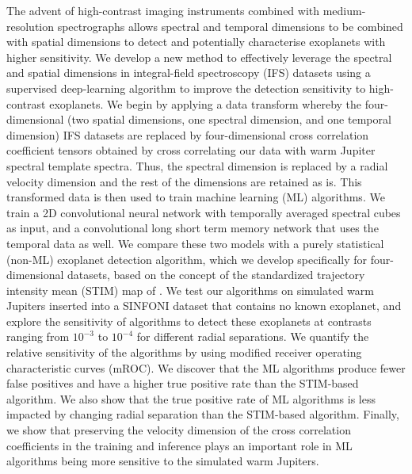 \documentclass{aa}
\begin{document}
  \abstract
  {The advent of high-contrast imaging instruments combined with medium-resolution spectrographs allows spectral and temporal dimensions to be combined with spatial dimensions to detect and potentially characterise exoplanets with higher sensitivity.}
  {We develop a new method to effectively leverage the spectral and spatial dimensions in integral-field spectroscopy (IFS) datasets using a supervised deep-learning algorithm to improve the detection sensitivity to high-contrast exoplanets.}
  {
  We begin by applying a data transform whereby the four-dimensional (two spatial dimensions, one spectral dimension, and one temporal dimension) IFS datasets are replaced by four-dimensional cross correlation coefficient tensors obtained by cross correlating our data with warm Jupiter spectral template spectra.
  Thus, the spectral dimension is replaced by a radial velocity dimension and the rest of the dimensions are retained as is.
  This transformed data is then used to train machine learning (ML) algorithms.
  We train a 2D convolutional neural network 
  with temporally averaged spectral cubes as input, and a convolutional long short term memory network that uses the temporal data as well.
  We compare these two models with a purely statistical (non-ML) exoplanet detection algorithm, which we develop specifically for four-dimensional datasets, based on the concept of the standardized trajectory intensity mean (STIM) map of \citet{2019Pairet}.
  We test our algorithms on simulated warm Jupiters inserted into a SINFONI dataset that contains no known exoplanet, and explore the sensitivity of algorithms to detect these exoplanets at contrasts ranging from $10^{-3}$ to $10^{-4}$ for different radial separations.
  }
  {%
  We quantify the relative sensitivity of the algorithms by using modified receiver operating characteristic curves (mROC).
  We discover that the ML algorithms produce fewer false positives and have a higher true positive rate than the STIM-based algorithm.
  We also show that the true positive rate of ML algorithms is less impacted by changing radial separation than the STIM-based algorithm.
  Finally, we show that preserving the velocity dimension of the cross correlation coefficients in the training and inference plays an important role in ML algorithms being more sensitive to the simulated warm Jupiters.}
\end{document}
